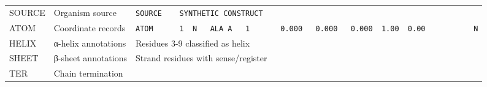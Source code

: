 \documentclass[12pt,a4paper]{article}
\begin{document}
\begin{longtable}[]{@{}lll@{}}
\begin{minipage}[t]{0.28\columnwidth}\raggedright
SOURCE\strut
\end{minipage} & \begin{minipage}[t]{0.32\columnwidth}\raggedright
Organism source\strut
\end{minipage} & \begin{minipage}[t]{0.32\columnwidth}\raggedright
\texttt{SOURCE\ \ \ \ SYNTHETIC\ CONSTRUCT}\strut
\end{minipage}\tabularnewline
\begin{minipage}[t]{0.28\columnwidth}\raggedright
ATOM\strut
\end{minipage} & \begin{minipage}[t]{0.32\columnwidth}\raggedright
Coordinate records\strut
\end{minipage} & \begin{minipage}[t]{0.32\columnwidth}\raggedright
\texttt{ATOM\ \ \ \ \ \ 1\ \ N\ \ \ ALA\ A\ \ \ 1\ \ \ \ \ \ \ 0.000\ \ \ 0.000\ \ \ 0.000\ \ 1.00\ \ 0.00\ \ \ \ \ \ \ \ \ \ \ N}\strut
\end{minipage}\tabularnewline
\begin{minipage}[t]{0.28\columnwidth}\raggedright
HELIX\strut
\end{minipage} & \begin{minipage}[t]{0.32\columnwidth}\raggedright
α-helix annotations\strut
\end{minipage} & \begin{minipage}[t]{0.32\columnwidth}\raggedright
Residues 3-9 classified as helix\strut
\end{minipage}\tabularnewline
\begin{minipage}[t]{0.28\columnwidth}\raggedright
SHEET\strut
\end{minipage} & \begin{minipage}[t]{0.32\columnwidth}\raggedright
β-sheet annotations\strut
\end{minipage} & \begin{minipage}[t]{0.32\columnwidth}\raggedright
Strand residues with sense/register\strut
\end{minipage}\tabularnewline
\begin{minipage}[t]{0.28\columnwidth}\raggedright
TER\strut
\end{minipage} & \begin{minipage}[t]{0.32\columnwidth}\raggedright
Chain termination\strut
\end{minipage} & \begin{minipage}[t]{0.32\columnwidth}\raggedright

\end{minipage}
\end{longtable}
\end{document}
